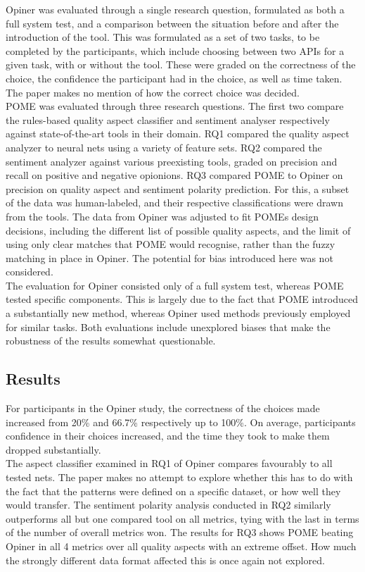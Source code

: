 \documentclass[a4paper,10pt, bibliography=totocnumbered]{scrreprt}
\begin{document}
Opiner was evaluated through a single research question, formulated as both a full system test, and a comparison between the situation before and after the introduction of the tool. This was formulated as a set of two tasks, to be completed by the participants, which include choosing between two APIs for a given task, with or without the tool. These were graded on the correctness of the choice, the confidence the participant had in the choice, as well as time taken. The paper makes no mention of how the correct choice was decided.\\
POME was evaluated through three research questions. The first two compare the rules-based quality aspect classifier and sentiment analyser respectively against state-of-the-art tools in their domain. RQ1 compared the quality aspect analyzer to neural nets using a variety of feature sets. RQ2 compared the sentiment analyzer against various preexisting tools, graded on precision and recall on positive and negative opionions. RQ3 compared POME to Opiner on precision on quality aspect and sentiment polarity prediction. For this, a subset of the data was human-labeled, and their respective classifications were drawn from the tools. The data from Opiner was adjusted to fit POMEs design decisions, including the different list of possible quality aspects, and the limit of using only clear matches that POME would recognise, rather than the fuzzy matching in place in Opiner. The potential for bias introduced here was not considered.\\
The evaluation for Opiner consisted only of a full system test, whereas POME tested specific components. This is largely due to the fact that POME introduced a substantially new method, whereas Opiner used methods previously employed for similar tasks. Both evaluations include unexplored biases that make the robustness of the results somewhat questionable.

\subsection{Results}

For participants in the Opiner study, the correctness of the choices made increased from 20\% and 66.7\% respectively up to 100\%. On average, participants confidence in their choices increased, and the time they took to make them dropped substantially.\\
The aspect classifier examined in RQ1 of Opiner compares favourably to all tested nets. The paper makes no attempt to explore whether this has to do with the fact that the patterns were defined on a specific dataset, or how well they would transfer. The sentiment polarity analysis conducted in RQ2 similarly outperforms all but one compared tool on all metrics, tying with the last in terms of the number of overall metrics won. The results for RQ3 shows POME beating Opiner in all 4 metrics over all quality aspects with an extreme offset. How much the strongly different data format affected this is once again not explored.
\end{document}
